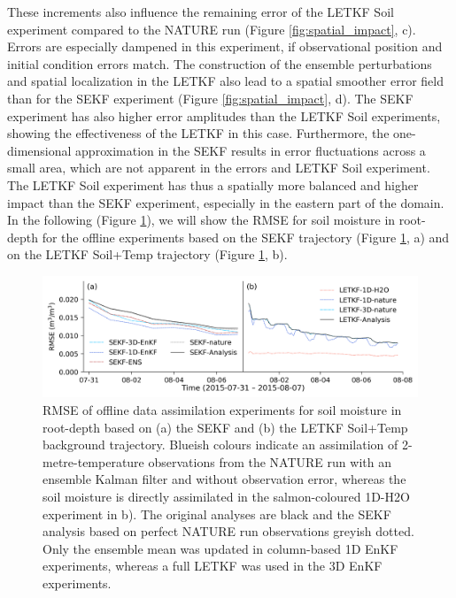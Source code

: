 \documentclass[hess, manuscript]{copernicus}
\begin{document}
These increments also influence the remaining error of the LETKF Soil experiment compared to the NATURE run (Figure \ref{fig:spatial_impact}, c).
Errors are especially dampened in this experiment, if observational position and initial condition errors match.
The construction of the ensemble perturbations \citep{hunt_efficient_2007} and spatial localization in the LETKF also lead to a spatial smoother error field than for the SEKF experiment (Figure \ref{fig:spatial_impact}, d).
The SEKF experiment has also higher error amplitudes than the LETKF Soil experiments, showing the effectiveness of the LETKF in this case.
Furthermore, the one-dimensional approximation in the SEKF results in error fluctuations across a small area, which are not apparent in the errors and LETKF Soil experiment.
The LETKF Soil experiment has thus a spatially more balanced and higher impact than the SEKF experiment, especially in the eastern part of the domain.\\

In the following (Figure \ref{fig:offline_exp}), we will show the RMSE for soil moisture in root-depth for the offline experiments based on the SEKF trajectory (Figure \ref{fig:offline_exp}, a) and on the LETKF Soil+Temp trajectory (Figure \ref{fig:offline_exp}, b).

\begin{figure}[ht]
	\includegraphics{figures/fig_07_offline_exp.png}
	\caption{
		RMSE of offline data assimilation experiments for soil moisture in root-depth based on (a) the SEKF and (b) the LETKF Soil+Temp background trajectory.
		Blueish colours indicate an assimilation of 2-metre-temperature observations from the NATURE run with an ensemble Kalman filter and without observation error, whereas the soil moisture is directly assimilated in the salmon-coloured 1D-H2O experiment in b).
		The original analyses are black and the SEKF analysis based on perfect NATURE run observations greyish dotted.
		Only the ensemble mean was updated in column-based 1D EnKF experiments, whereas a full LETKF was used in the 3D EnKF experiments.
	}
	\label{fig:offline_exp}
\end{figure}
\end{document}

